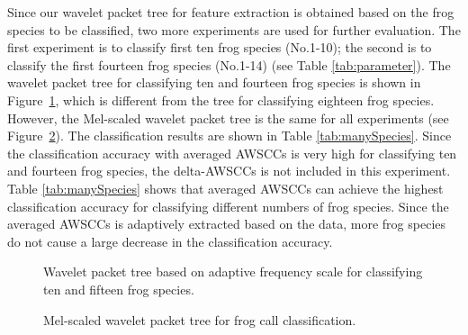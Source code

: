 Since our wavelet packet tree for feature extraction is obtained based on the frog species to be classified, two more experiments are used for further evaluation. The first experiment is to classify first ten frog species (No.1-10); the second is to classify the first fourteen frog species (No.1-14) (see Table \ref{tab:parameter}). The wavelet packet tree for classifying ten and fourteen frog species is shown in Figure~\ref{fig:wpTree}, which is different from the tree for classifying eighteen frog species. However, the Mel-scaled wavelet packet tree is the same for all experiments (see Figure~\ref{fig:melTree}). The classification results are shown in Table \ref{tab:manySpecies}. Since the classification accuracy with averaged AWSCCs is very high for classifying ten and fourteen frog species, the delta-AWSCCs is not included in this experiment. Table \ref{tab:manySpecies} shows that averaged AWSCCs can achieve the highest classification accuracy for classifying different numbers of frog species. Since the averaged AWSCCs is adaptively extracted based on the data, more frog species do not cause a large decrease in the classification accuracy.  



\begin{figure}[htb!] %
\caption{Wavelet packet tree based on adaptive frequency scale for classifying ten and fifteen frog species.}
\label{fig:wpTree} 
\end{figure}


\begin{figure}[htb!] %
\caption{Mel-scaled wavelet packet tree for frog call classification.}
\label{fig:melTree} 
\end{figure}


